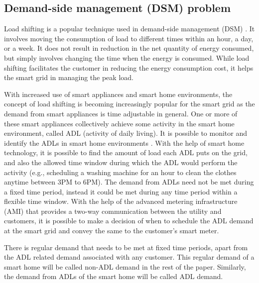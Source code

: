 \subsection{Demand-side management (DSM) problem}
Load shifting is a popular technique used in demand-side management (DSM) \cite{DTU2010}. It involves moving the consumption of load to different times within an hour,  a day, or  a week. It does not result in reduction in the net quantity of energy consumed, but simply involves changing the time when the energy is consumed. While load shifting facilitates the customer in reducing the energy consumption cost, it helps the smart grid in managing the peak load.

With increased use of smart appliances and smart home environments, the concept of load shifting is becoming increasingly popular for the smart grid as the demand from smart appliances is time adjustable in general. One or more of these smart appliances collectively achieve some activity in the smart home environment, called ADL (activity of daily living). It is possible to monitor and identify the ADLs in smart home environments \cite{GPG2016}.%
  With the help of smart home technology, it is possible to find the amount of load each ADL puts on the grid, and also the allowed time window during which the ADL would perform the activity (e.g., scheduling a  washing machine for an hour to clean the clothes anytime between 3PM to 6PM). 
 The demand from  ADLs need not be met during a fixed time period, instead it could be met during any time period within a flexible time window. With the help of the advanced metering infrastructure (AMI) that provides a two-way communication between the utility and customers, it is possible to make a decision of when to schedule the ADL demand at the smart grid and convey the same to the customer's smart meter. 

There is  regular demand that needs to be met at fixed time periods, apart from the ADL related demand associated with any customer. This regular demand of a smart home will be called non-ADL demand in the rest of the paper. Similarly, the demand from  ADLs of the smart home will be called ADL demand.

